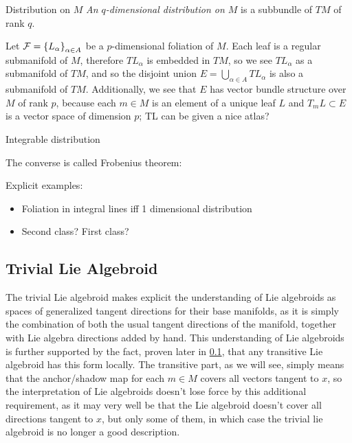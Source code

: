 \begin{definition}{Distribution on $M$}
\emph{An $q$-dimensional distribution on $M$} is a subbundle of $TM$ of rank $q$.
\end{definition}

Let $\mathcal F = \left\{ L_\alpha \right\}_{\alpha \in A}$ be a $p$-dimensional foliation of $M$. Each leaf is a regular submanifold of $M$, therefore $T L_\alpha$ is embedded in $TM$, so we see $T L_\alpha$ as a submanifold  of $TM$, and so the disjoint union $E = \bigcup_{\alpha \in A} T L_\alpha$ is also a submanifold of $TM$. Additionally, we see that $E$ has vector bundle structure over $M$ of rank $p$, because each $m \in M$ is an element of a unique leaf $L$ and $T_m L \subset E$ is a vector space of dimension $p$; TL can be given a nice atlas?

Integrable distribution

The converse is called Frobenius theorem:

Explicit examples:

\begin{itemize}
    \item Foliation in integral lines iff 1 dimensional distribution
    \item Second class? First class?
\end{itemize}

\subsection{Trivial Lie Algebroid}

The trivial Lie algebroid makes explicit the understanding of Lie algebroids as spaces of generalized tangent directions for their base manifolds, as it is simply the combination of both the usual tangent directions of the manifold, together with Lie algebra directions added by hand. This understanding of Lie algebroids is further supported by the fact, proven later in \ref{}, that any transitive Lie algebroid has this form locally. The transitive part, as we will see, simply means that the anchor/shadow map for each $m \in M$ covers all vectors tangent to $x$, so the interpretation of Lie algebroids doesn't lose force by this additional requirement, as it may very well be that the Lie algebroid doesn't cover all directions tangent to $x$, but only some of them, in which case the trivial lie algebroid is no longer a good description.

